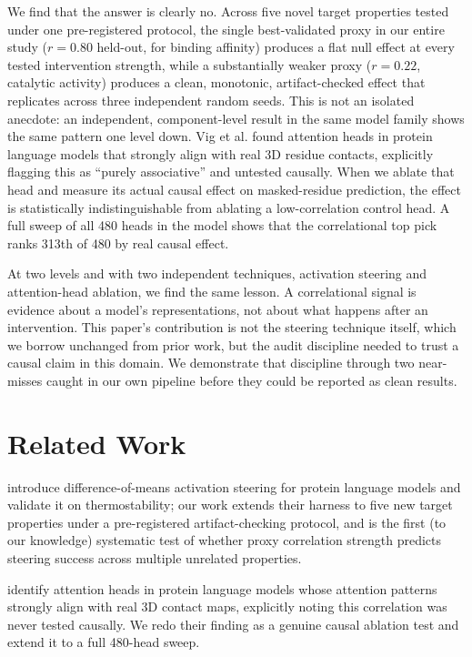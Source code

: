 \documentclass{article}
\begin{document}
We find that the answer is clearly no. Across five novel
target properties tested under one pre-registered protocol, the single
best-validated proxy in our entire study ($r=0.80$ held-out, for binding
affinity) produces a flat null effect at every tested intervention
strength, while a substantially weaker proxy ($r=0.22$, catalytic
activity) produces a clean, monotonic, artifact-checked effect that
replicates across three independent random seeds. This is not an isolated
anecdote: an independent, component-level result in the same model
family shows the same pattern one level down. Vig et al.
\citep{vig2021bertology} found attention heads in protein language models
that strongly align with real 3D residue contacts, explicitly flagging
this as ``purely associative'' and untested causally. When we ablate
that head and measure its actual causal effect on masked-residue
prediction, the effect is statistically indistinguishable from ablating
a low-correlation control head. A full sweep of all 480 heads in the
model shows that the correlational top pick ranks 313th of 480 by real
causal effect.

At two levels and with two independent techniques, activation steering
and attention-head ablation, we find the same lesson. A correlational
signal is evidence about a model's representations, not about what
happens after an intervention. This paper's contribution is not the
steering technique itself, which we borrow unchanged from prior work, but
the audit discipline needed to trust a causal claim in this domain. We
demonstrate that discipline through two near-misses caught in our own
pipeline before they could be reported as clean results.

\section{Related Work}

\citet{huang2025steering} introduce difference-of-means activation
steering for protein language models and validate it on thermostability;
our work extends their harness to five new target properties under a
pre-registered artifact-checking protocol, and is the first (to our
knowledge) systematic test of whether proxy correlation strength predicts
steering success across multiple unrelated properties.

\citet{vig2021bertology} identify attention heads in protein language
models whose attention patterns strongly align with real 3D contact
maps, explicitly noting this correlation was never tested causally. We
redo their finding as a genuine causal ablation test and extend it to a
full 480-head sweep.
\end{document}
